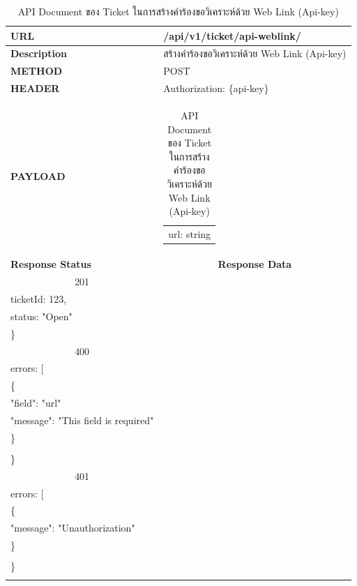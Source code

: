 \documentclass[12pt,oneside,openright,a4paper]{cpe-thai-project}
\begin{document}
\begin{longtable}[!ht]{p{3cm}|p{8cm}}
  \caption{API Document ของ Ticket ในการสร้างคำร้องขอวิเคราะห์ด้วย Web Link (Api-key)}\label{tbl:api_ticket_key} 
    \endfirsthead
    \endhead
    \hhline{==}  
    \textbf{URL}              & /api/v1/ticket/api-weblink/                                                                                            \\ \hline
    \textbf{Description}      & สร้างคำร้องขอวิเคราะห์ด้วย Web Link (Api-key)                                                                                     \\ \hline
    \textbf{METHOD}           & POST                                                                                                                 \\ \hline
    \textbf{HEADER}           & Authorization: \{api-key\}                                                                                         \\ \hline
    \textbf{PAYLOAD}          & \begin{tabular}[c]{@{}l@{}}url: string\end{tabular}  \\ \hline \newpage \hline
    \textbf{Response Status}  & \multicolumn{1}{c}{\textbf{Response Data}}                                                                          \\ \hline
    \multicolumn{1}{c|}{201}  & \begin{tabular}[c]{@{}l@{}}\{\\ \quad ticketId: 123,\\ \quad status: "Open"\\ \}\end{tabular}                                 \\ \hline
    \multicolumn{1}{c|}{400}  &
    \begin{tabular}[c]{@{}l@{}}\{\\ \quad errors: {[}\\ \quad\quad\{\\ \quad\quad\quad "field": "url"\\ \quad\quad\quad "message": "This field is required"\\ \quad\quad \}\\ \quad{]}\\\}\end{tabular} \\ \hline
    \multicolumn{1}{c|}{401}  &
    \begin{tabular}[c]{@{}l@{}}\{\\ \quad errors: {[}\\ \quad\quad\{\\ \quad\quad\quad"message": "Unauthorization"\\ \quad\quad\}\\\quad {]}\\ \}\end{tabular}                                                                         \\ \hline
    \hhline{==}  
\end{longtable}
\end{document}
